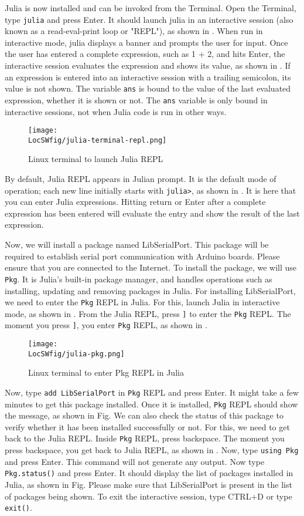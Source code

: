 Julia is now installed and can be invoked from the Terminal. Open the Terminal, type {\tt julia} and press Enter. It should launch julia in 
an interactive session (also known as a read-eval-print loop or "REPL"), as shown 
in . When run in interactive mode, julia displays a banner and 
prompts the user for input. Once the user has entered a complete expression, 
such as 1 + 2, and hits Enter, the interactive session evaluates the expression 
and shows its value, as shown in . If an expression is entered 
into an interactive session with a trailing semicolon, its value is not shown. The variable {\tt ans} is 
bound to the value of the last evaluated expression, whether it is shown or not. 
The {\tt ans} variable is only bound in interactive sessions, not when Julia code is run in other ways.
\begin{figure}
      \centering
      \texttt{[image: \\LocSWfig/julia-terminal-repl.png]}
      \caption{Linux terminal to launch Julia REPL}
      \label{julia-repl}
\end{figure}
By default, Julia REPL appears in Julian prompt. It is the default mode of 
operation; each new line initially starts with {\tt julia>}, as 
shown in . It is here that you can enter Julia expressions. 
Hitting return or Enter after a complete expression has been entered will evaluate 
the entry and show the result of the last expression. 

Now, we will install a package named LibSerialPort. This package will be required to 
establish serial port communication with Arduino boards. Please ensure that you 
are connected to the Internet. To install the package,  
we will use {\tt Pkg}. It is Julia's built-in package manager, and 
handles operations such as installing, updating and removing packages in Julia. 
For installing LibSerialPort, we need to enter the {\tt Pkg} REPL in Julia. 
For this, launch Julia in interactive mode, as shown in . 
From the Julia REPL, press {\tt ]} to enter the {\tt Pkg} REPL. The moment you press 
{\tt ]}, you enter {\tt Pkg} REPL, as shown in .  
\begin{figure}
      \centering
      \texttt{[image: \\LocSWfig/julia-pkg.png]}
      \caption{Linux terminal to enter Pkg REPL in Julia}
      \label{julia-pkg}
\end{figure}
Now, type {\tt add LibSerialPort} in {\tt Pkg} REPL and press Enter. It might take a few minutes 
to get this package installed. Once it is installed, {\tt Pkg} REPL should show the message, 
as shown in Fig. We can also check the status of this package to verify whether it has been installed 
successfully or not. For this, we need to get back to the Julia REPL. Inside {\tt Pkg}
REPL, press backspace. The moment you press backspace, you get back to Julia REPL, as shown in 
. Now, type {\tt using Pkg} and press Enter. This command will not 
generate any output. Now type {\tt Pkg.status()} and press Enter. It should display the 
list of packages installed in Julia, as shown in Fig. Please make sure that LibSerialPort 
is present in the list of packages being shown. 
To exit the interactive session, type CTRL+D or type {\tt exit()}. 

